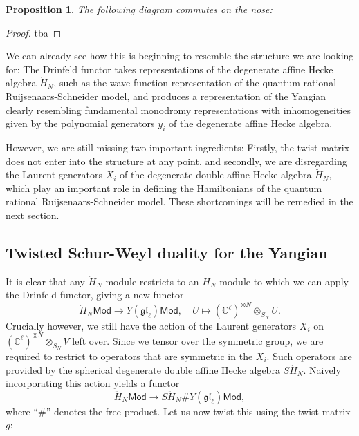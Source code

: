 \documentclass[11pt]{report}
\newtheorem{prop}[theorem]{Proposition}
\theoremstyle{definition}
\theoremstyle{remark}
\theoremstyle{remark}
\newcommand{\C}{\mathbb{C}}
\begin{document}
\begin{prop}
The following diagram commutes on the nose:
\begin{center}
\end{center}
\end{prop}

\begin{proof}
tba
\end{proof}

We can already see how this is beginning to resemble the structure we are looking for: The Drinfeld functor takes representations of the degenerate affine Hecke algebra $\dot H_N$, such as the wave function representation of the quantum rational Ruijsenaars-Schneider model, and produces a representation of the Yangian clearly resembling fundamental monodromy representations with inhomogeneities given by the polynomial generators $y_i$ of the degenerate affine Hecke algebra.

However, we are still missing two important ingredients: Firstly, the twist matrix does not enter into the structure at any point, and secondly, we are disregarding the Laurent generators $X_i$ of the degenerate double affine Hecke algebra $\ddot H_N$, which play an important role in defining the Hamiltonians of the quantum rational Ruijsenaars-Schneider model. These shortcomings will be remedied in the next section.

\subsection{Twisted Schur-Weyl duality for the Yangian}

It is clear that any $\ddot H_N$-module restricts to an $\dot H_N$-module to which we can apply the Drinfeld functor, giving a new functor
\begin{equation*}
\ddot H_N\mathsf{Mod} \to Y(\mathfrak{gl}_\ell)\mathsf{Mod}, \quad U \mapsto (\C^\ell)^{\otimes N} \otimes_{S_N} U.
\end{equation*}
Crucially however, we still have the action of the Laurent generators $X_i$ on $(\C^\ell)^{\otimes N} \otimes_{S_N} V$ left over. Since we tensor over the symmetric group, we are required to restrict to operators that are symmetric in the $X_i$. Such operators are provided by the spherical degenerate double affine Hecke algebra $S\ddot H_N$. Naively incorporating this action yields a functor
\begin{equation*}
\ddot H_N\mathsf{Mod} \to S\ddot H_N \# Y(\mathfrak{gl}_\ell)\mathsf{Mod},
\end{equation*}
where “$\#$” denotes the free product. Let us now twist this using the twist matrix $g$:
\end{document}
